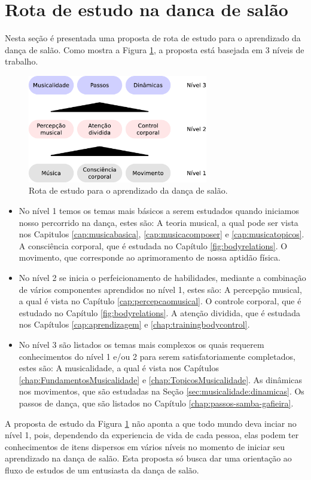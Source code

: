 \section{Rota de estudo na danca de salão}
\label{sec:dance-elements-processo}
Nesta seção é presentada uma proposta de rota de estudo para o aprendizado da
dança de salão. 
Como mostra a Figura \ref{fig:dance-elements-processo},
a proposta está basejada em 3 níveis de trabalho.
\begin{figure}[!h]
\centering
\includegraphics[width=0.7\textwidth]{chapters/cap-dance-elements/Diagrama-danca.eps}
\caption{Rota de estudo para o aprendizado da dança de salão.}
\label{fig:dance-elements-processo}
\end{figure}
\begin{itemize}
\item No nível 1 temos os temas mais básicos a serem estudados quando
iniciamos nosso percorrido na dança, estes são:
A teoria musical, a qual pode ser vista nos 
Capitulos \ref{cap:musicabasica}, \ref{cap:musicacomposer} e \ref{cap:musicatopicos}.
A consciência corporal, que é estudada no Capítulo \ref{fig:bodyrelations}.
O movimento, que corresponde ao aprimoramento de nossa aptidão física.
\item No nível 2 se inicia o perfeicionamento de habilidades,
mediante a combinação de vários componentes aprendidos no nível 1, estes são:
A percepção musical, a qual é vista no Capítulo \ref{cap:percepcaomusical}.
O controle corporal, que é estudado no Capítulo \ref{fig:bodyrelations}.
A atenção dividida, que é estudada nos Capítulos \ref{cap:aprendizagem} e \ref{chap:trainingbodycontrol}.
\item No nível 3 são listados os temas mais complexos os quais
requerem conhecimentos do nível 1 e/ou 2 para serem satisfatoriamente completados,
estes são:
A musicalidade, a qual é vista nos Capítulos \ref{chap:FundamentosMusicalidade} e \ref{chap:TopicosMusicalidade}.
As dinâmicas nos movimentos, que são estudadas na Seção \ref{sec:musicalidade:dinamicas}.
Os passos de dança, que são listados no Capítulo \ref{chap:passos-samba-gafieira}.
\end{itemize}
A proposta de estudo da Figura \ref{fig:dance-elements-processo} não aponta a que 
todo mundo deva inciar no nível 1, 
pois, dependendo da experiencia de vida de cada pessoa, elas podem ter conhecimentos de itens
dispersos em vários níveis no momento de iniciar seu aprendizado na dança de salão.
Esta proposta só busca dar uma orientação ao fluxo de estudos de um entusiasta da dança de salão.

